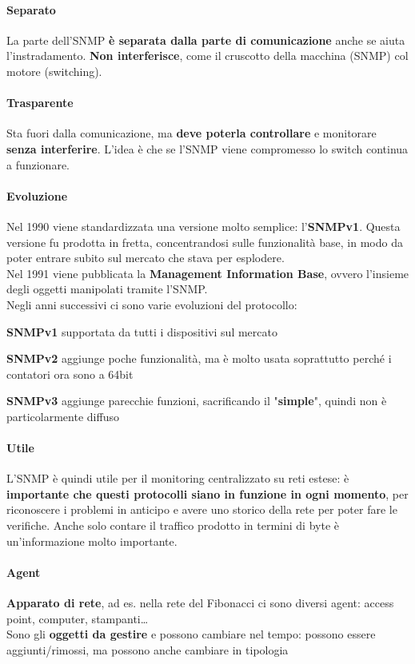 \documentclass[10pt]{book}
\begin{document}
\paragraph{Separato} La parte dell'SNMP \textbf{è separata dalla parte di comunicazione} anche se aiuta l'instradamento. \textbf{Non interferisce}, come il cruscotto della macchina (SNMP) col motore (switching).
\paragraph{Trasparente} Sta fuori dalla comunicazione, ma \textbf{deve poterla controllare} e monitorare \textbf{senza interferire}. L'idea è che se l'SNMP viene compromesso lo switch continua a funzionare.
\paragraph{Evoluzione} Nel 1990 viene standardizzata una versione molto semplice: l'\textbf{SNMPv1}. Questa versione fu prodotta in fretta, concentrandosi sulle funzionalità base, in modo da poter entrare subito sul mercato che stava per esplodere.\\
Nel 1991 viene pubblicata la \textbf{Management Information Base}, ovvero l'insieme degli oggetti manipolati tramite l'SNMP.\\
Negli anni successivi ci sono varie evoluzioni del protocollo:
\begin{list}{}{}
	\item \textbf{SNMPv1} supportata da tutti i dispositivi sul mercato
	\item \textbf{SNMPv2} aggiunge poche funzionalità, ma è molto usata soprattutto perché i contatori ora sono a 64bit
	\item \textbf{SNMPv3} aggiunge parecchie funzioni, sacrificando il "\textbf{simple}", quindi non è particolarmente diffuso
\end{list}
\paragraph{Utile} L'SNMP è quindi utile per il monitoring centralizzato su reti estese: è \textbf{importante che questi protocolli siano in funzione in ogni momento}, per riconoscere i problemi in anticipo e avere uno storico della rete per poter fare le verifiche. Anche solo contare il traffico prodotto in termini di byte è un'informazione molto importante.
\paragraph{Agent} \textbf{Apparato di rete}, ad es. nella rete del Fibonacci ci sono diversi agent: access point, computer, stampanti\ldots\\
Sono gli \textbf{oggetti da gestire} e possono cambiare nel tempo: possono essere aggiunti/rimossi, ma possono anche cambiare in tipologia
\end{document}
